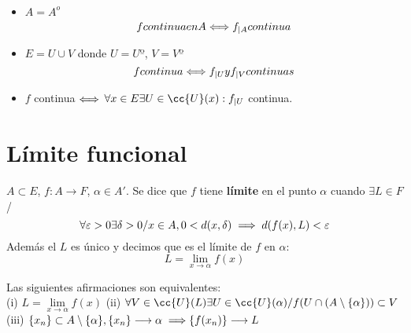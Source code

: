 \begin{prop} \\
    \begin{itemize}
        \item $A = A^o$ $$f \\ continua \\ en \\ A \Longleftrightarrow f_{|A} \\ continua$$
        \item $E = U \cup V$ donde $U = Uº$, $V = Vº$ 
        $$f \\ continua \Longleftrightarrow f_{|U} \\ y \\ f_{|V} \\ continuas$$
        \item $f$ continua $\Longleftrightarrow$ $\forall x \in E\\ \exists U \in \cc{U}(x) : f_{|U}$ continua.
    \end{itemize}
\end{prop}

\section{Límite funcional}
\begin{definicion}
    $A \subset E$, $f:A \longrightarrow F$, $\alpha \in A'$.
    Se dice que $f$ tiene \textbf{límite} en el punto $\alpha$ cuando $\exists L \in F$ /\\
    $$\forall \varepsilon >0 \\ \exists \delta > 0 \\ / \\ x \in A, 0 < d(x,\delta) \implies d (f(x), L) < \varepsilon$$
    Además el $L$ es único y decimos que es el límite de $f$ en $\alpha$:
    $$L = \lim_{x\to \alpha} f(x)$$
\end{definicion}

\begin{prop}[Caracterización]
    Las siguientes afirmaciones son equivalentes:\\
    (i) $L = \lim\limits_{x \to \alpha} f(x)$ \newline
    (ii) $\forall V \in \cc{U}(L) \\ \exists U \in \cc{U}(\alpha) \\ /\\ f(U\cap (A\setminus \{\alpha\})) \subset V$\newline
    (iii) $\{x_n\} \subset A\setminus \{\alpha\}, \\ \{x_n\} \longrightarrow \alpha \\ \implies \\ \{f(x_n)\} \longrightarrow L$
\end{prop}

